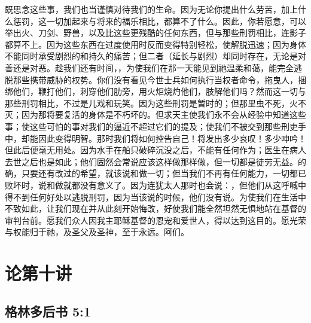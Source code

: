 既思念这些事，我们也当谨慎对待我们的生命。因为无论你提出什么劳苦，加上什么惩罚，这一切加起来与将来的福乐相比，都算不了什么。因此，你若愿意，可以举出火、刀剑、野兽，以及比这些更残酷的任何东西，但与那些刑罚相比，连影子都算不上。因为这些东西在过度使用时反而变得特别轻松，使解脱迅速；因为身体不能同时承受剧烈的和持久的痛苦；但二者（延长与剧烈）却同时存在，无论是对善还是对恶。趁我们还有时间，，为使我们在那一天能见到祂温柔和蔼，能完全逃脱那些携带威胁的权势。你们没有看见今世士兵如何执行当权者命令，拖曳人，捆绑他们，鞭打他们，刺穿他们肋旁，用火炬烧灼他们，肢解他们吗？然而这一切与那些刑罚相比，不过是儿戏和玩笑。因为这些刑罚是暂时的；但那里虫不死，火不灭；因为那将要复活的身体是不朽坏的。但求天主使我们永不会从经验中知道这些事；使这些可怕的事对我们的逼近不超过它们的提及；使我们不被交到那些刑吏手中，却能因此变得明智。那时我们将如何控告自己！将发出多少哀叹！多少呻吟！但此后便毫无用处。因为水手在船只破碎沉没之后，不能有任何作为；医生在病人去世之后也是如此；他们固然会常说应该这样做那样做，但一切都是徒劳无益。的确，只要还有改过的希望，就该说和做一切；但当我们不再有任何能力，一切都已败坏时，说和做就都没有意义了。因为连犹太人那时也会说：，但他们从这呼喊中得不到任何好处以逃脱刑罚，因为当该说的时候，他们没有说。为使我们在生活中不致如此，让我们现在并从此刻开始悔改，好使我们能全然坦然无惧地站在基督的审判台前。愿我们众人因我主耶稣基督的恩宠和爱世人，得以达到这目的。愿光荣与权能归于祂，及圣父及圣神，至于永远。阿们。\par



\section{论第十讲}


\subsection{格林多后书 5:1}

\par

